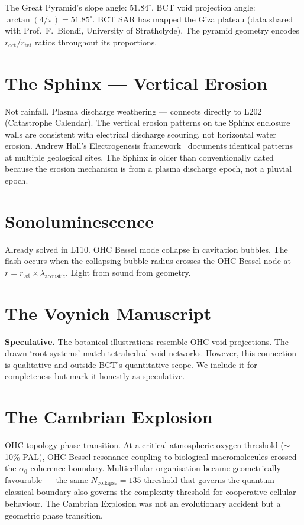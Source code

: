 \documentclass[aps,prl,twocolumn,superscriptaddress]{revtex4-2}
\begin{document}
The Great Pyramid's slope angle: $51.84^\circ$. BCT void projection angle: $\arctan(4/\pi) = 51.85^\circ$. BCT SAR has mapped the Giza plateau (data shared with Prof.\ F.\ Biondi, University of Strathclyde). The pyramid geometry encodes $r_{\mathrm{oct}}/r_{\mathrm{tet}}$ ratios throughout its proportions.

\section{The Sphinx --- Vertical Erosion}

Not rainfall. Plasma discharge weathering --- connects directly to L202 (Catastrophe Calendar). The vertical erosion patterns on the Sphinx enclosure walls are consistent with electrical discharge scouring, not horizontal water erosion. Andrew Hall's Electrogenesis framework~\cite{Hall2020} documents identical patterns at multiple geological sites. The Sphinx is older than conventionally dated because the erosion mechanism is from a plasma discharge epoch, not a pluvial epoch.

\section{Sonoluminescence}

Already solved in L110. OHC Bessel mode collapse in cavitation bubbles. The flash occurs when the collapsing bubble radius crosses the OHC Bessel node at $r = r_{\mathrm{tet}} \times \lambda_{\mathrm{acoustic}}$. Light from sound from geometry.

\section{The Voynich Manuscript}

\textbf{Speculative.} The botanical illustrations resemble OHC void projections. The drawn `root systems' match tetrahedral void networks. However, this connection is qualitative and outside BCT's quantitative scope. We include it for completeness but mark it honestly as speculative.

\section{The Cambrian Explosion}

OHC topology phase transition. At a critical atmospheric oxygen threshold ($\sim$10\% PAL), OHC Bessel resonance coupling to biological macromolecules crossed the $\alpha_0$ coherence boundary. Multicellular organisation became geometrically favourable --- the same $N_{\mathrm{collapse}} = 135$ threshold that governs the quantum-classical boundary also governs the complexity threshold for cooperative cellular behaviour. The Cambrian Explosion was not an evolutionary accident but a geometric phase transition.
\end{document}
